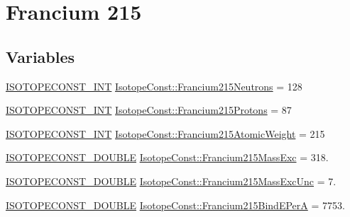 \hypertarget{group___isotope_const-_francium-_fr215}{}\section{Francium 215}
\label{group___isotope_const-_francium-_fr215}
\subsection*{Variables}
\begin{DoxyCompactItemize}
\item 
\mbox{\hyperlink{group___isotope_const-_macros_ga5f18360b3e99483a35c32d789e62621c}{I\+S\+O\+T\+O\+P\+E\+C\+O\+N\+S\+T\+\_\+\+I\+NT}} \mbox{\hyperlink{group___isotope_const-_francium-_fr215_ga948273d54866957ab5cbe3caffcaa257}{Isotope\+Const\+::\+Francium215\+Neutrons}} = 128
\item 
\mbox{\hyperlink{group___isotope_const-_macros_ga5f18360b3e99483a35c32d789e62621c}{I\+S\+O\+T\+O\+P\+E\+C\+O\+N\+S\+T\+\_\+\+I\+NT}} \mbox{\hyperlink{group___isotope_const-_francium-_fr215_ga1263c4223ecf5b92d8d59382d9f86129}{Isotope\+Const\+::\+Francium215\+Protons}} = 87
\item 
\mbox{\hyperlink{group___isotope_const-_macros_ga5f18360b3e99483a35c32d789e62621c}{I\+S\+O\+T\+O\+P\+E\+C\+O\+N\+S\+T\+\_\+\+I\+NT}} \mbox{\hyperlink{group___isotope_const-_francium-_fr215_ga0632d05c0218efab19285fabaf8dc520}{Isotope\+Const\+::\+Francium215\+Atomic\+Weight}} = 215
\item 
\mbox{\hyperlink{group___isotope_const-_macros_ga8f45a7272ce02c0b4c65c44636ed719a}{I\+S\+O\+T\+O\+P\+E\+C\+O\+N\+S\+T\+\_\+\+D\+O\+U\+B\+LE}} \mbox{\hyperlink{group___isotope_const-_francium-_fr215_gaf698337aea65d988da42f7cc55c5c5d5}{Isotope\+Const\+::\+Francium215\+Mass\+Exc}} = 318.
\item 
\mbox{\hyperlink{group___isotope_const-_macros_ga8f45a7272ce02c0b4c65c44636ed719a}{I\+S\+O\+T\+O\+P\+E\+C\+O\+N\+S\+T\+\_\+\+D\+O\+U\+B\+LE}} \mbox{\hyperlink{group___isotope_const-_francium-_fr215_gaf25e51f7a1ca37410dbbac133e9f99bb}{Isotope\+Const\+::\+Francium215\+Mass\+Exc\+Unc}} = 7.
\item 
\mbox{\hyperlink{group___isotope_const-_macros_ga8f45a7272ce02c0b4c65c44636ed719a}{I\+S\+O\+T\+O\+P\+E\+C\+O\+N\+S\+T\+\_\+\+D\+O\+U\+B\+LE}} \mbox{\hyperlink{group___isotope_const-_francium-_fr215_ga719eca53131603ffa9619beffc14035a}{Isotope\+Const\+::\+Francium215\+Bind\+E\+PerA}} = 7753.
\item 

\end{DoxyCompactItemize}
